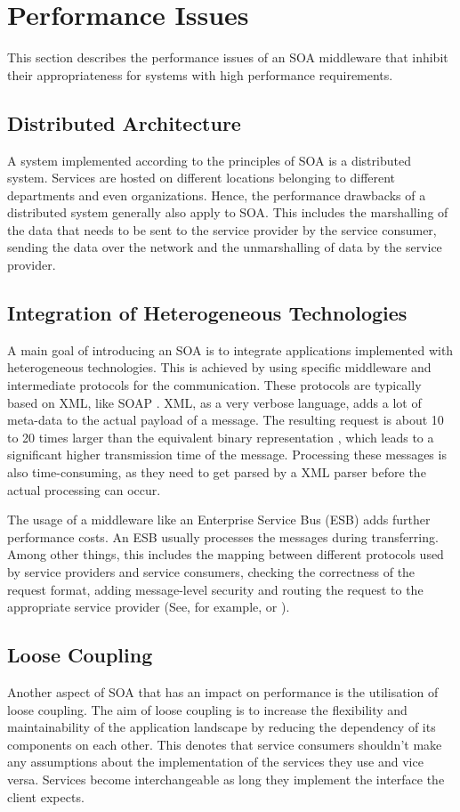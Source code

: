 \section{Performance Issues}
This section describes the performance issues of an SOA middleware that inhibit their appropriateness for systems with high performance requirements.
\subsection{Distributed Architecture}
A system implemented according to the principles of SOA is a distributed system. Services are hosted on different locations belonging to different departments and even organizations. Hence, the performance drawbacks of a distributed system generally also apply to SOA. This includes the marshalling of the data that needs to be sent to the service provider by the service consumer, sending the data over the network and the unmarshalling of data by the service provider.
\subsection{Integration of Heterogeneous Technologies}
A main goal of introducing an SOA is to integrate applications implemented with heterogeneous technologies. This is achieved by using specific middleware and intermediate protocols for the communication. These protocols are typically based on XML, like SOAP \citep{soap:2007}. XML, as a very verbose language, adds a lot of meta-data to the actual payload of a message. The resulting request is about 10 to 20 times larger than the equivalent binary representation \citep{OBrien:2007fk}, which leads to a significant higher transmission time of the message. Processing these messages is also time-consuming, as they need to get parsed by a XML parser before the actual processing can occur.

The usage of a middleware like an Enterprise Service Bus (ESB) adds further performance costs. An ESB usually processes the messages during transferring. Among other things, this includes the mapping between different protocols used by service providers and service consumers, checking the correctness of the request format, adding message-level security and routing the request to the appropriate service provider (See, for example, \citet{Josuttis:2007fk} or \citet{Krafzig:2005zc}).
\subsection{Loose Coupling}
Another aspect of SOA that has an impact on performance is the utilisation of loose coupling. The aim of loose coupling is to increase the flexibility and maintainability of the application landscape by reducing the dependency of its components on each other. This denotes that service consumers shouldn't make any assumptions about the implementation of the services they use and vice versa. Services become interchangeable as long they implement the interface the client expects.

